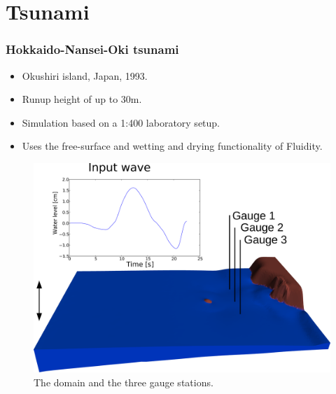 \section{Tsunami}

\begin{frame}
    \frametitle{Hokkaido-Nansei-Oki tsunami}
\begin{minipage}[]{0.5\linewidth} 
\begin{itemize}
\item Okushiri island, Japan, 1993. 
\item Runup height of up to 30m.
\item Simulation based on a 1:400 laboratory setup.
\item Uses the free-surface and wetting and drying functionality of Fluidity.
\end{itemize}
\end{minipage}
\hspace{0.5cm}
\begin{minipage}[]{0.4\linewidth} 
\begin{figure}
\begin{center}
\includegraphics[width=\textwidth]{hokkaido-nansei-oki_tsunami/MonaiValleyDomainWithInputWave2_png.pdf}
\end{center}
\caption{The domain and the three gauge stations.}\label{fig:monai_inputwave}
\end{figure}
\end{minipage}
\end{frame}

